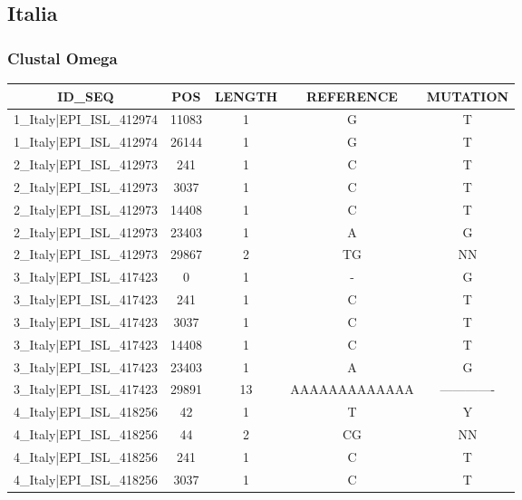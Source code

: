 \documentclass[a4paper,10pt]{article}
\begin{document}
\newpage
\subsection{Italia}

\subsubsection{Clustal Omega}

\begin{longtable}{@{}ccccc@{}}


\toprule
\textbf{ID\_SEQ} & \textbf{POS} & \textbf{LENGTH} & \textbf{REFERENCE} & \textbf{MUTATION} \\* \midrule
\endfirsthead
%
\cline{1-5}
\endhead
%
1\_Italy|EPI\_ISL\_412974 & 11083 & 1 & G & T \\* \midrule
1\_Italy|EPI\_ISL\_412974 & 26144 & 1 & G & T \\* \midrule
2\_Italy|EPI\_ISL\_412973 & 241 & 1 & C & T \\* \midrule
2\_Italy|EPI\_ISL\_412973 & 3037 & 1 & C & T \\* \midrule
2\_Italy|EPI\_ISL\_412973 & 14408 & 1 & C & T \\* \midrule
2\_Italy|EPI\_ISL\_412973 & 23403 & 1 & A & G \\* \midrule
2\_Italy|EPI\_ISL\_412973 & 29867 & 2 & TG & NN \\* \midrule
3\_Italy|EPI\_ISL\_417423 & 0 & 1 & - & G \\* \midrule
3\_Italy|EPI\_ISL\_417423 & 241 & 1 & C & T \\* \midrule
3\_Italy|EPI\_ISL\_417423 & 3037 & 1 & C & T \\* \midrule
3\_Italy|EPI\_ISL\_417423 & 14408 & 1 & C & T \\* \midrule
3\_Italy|EPI\_ISL\_417423 & 23403 & 1 & A & G \\* \midrule
3\_Italy|EPI\_ISL\_417423 & 29891 & 13 & AAAAAAAAAAAAA & ------------- \\* \midrule
4\_Italy|EPI\_ISL\_418256 & 42 & 1 & T & Y \\* \midrule
4\_Italy|EPI\_ISL\_418256 & 44 & 2 & CG & NN \\* \midrule
4\_Italy|EPI\_ISL\_418256 & 241 & 1 & C & T \\* \midrule
4\_Italy|EPI\_ISL\_418256 & 3037 & 1 & C & T \\* \midrule

\end{longtable}
\end{document}
